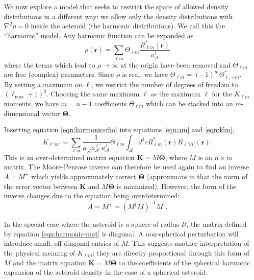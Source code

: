 \documentclass[fleqn,usenatbib]{mnras}
\begin{document}
We now explore a model that seeks to restrict the space of allowed density distributions in a different way: we allow only the density distributions with $\nabla^2 \rho = 0$ inside the asteroid (the harmonic distributions). We  call this  the ``harmonic'' model. Any harmonic function can be expanded as 
\begin{equation}
  \rho(\bm r) = \sum_{\ell m} \Theta_{\ell m}\frac{R_{\ell m}^*(\bm r)}{a_\mathcal{A}^\ell} 
  \label{eqn:harmonic-rho}
\end{equation}
where the terms which lead to $\rho \rightarrow \infty$ at the origin have been removed and $\Theta_{\ell m}$ are free (complex) parameters. Since $\rho$ is real, we have $\Theta_{\ell m}=(-1)^m \Theta_{\ell,-m}^*$. By setting a maximum on $\ell$, we restrict the number of degrees of freedom to $(\ell_\mathrm{max}+ 1)^2$. Choosing the same maximum $\ell$ as the maximum $\ell$ for the $K_{\ell m}$ moments, we have $m=n-1$ coefficients $\Theta_{\ell m}$ which can be stacked into an $m$-dimensional vector $\bm \Theta$.

Inserting equation \ref{eqn:harmonic-rho} into equations \ref{eqn:am} and \ref{eqn:klm},
\begin{equation}
  K_{\ell' m'} = \sum_{\ell m} \frac{1}{\mu_\mathcal{A} a_\mathcal{A}^{\ell'} a_\mathcal{A}^\ell} \Theta_{\ell m} \int_\mathcal{A} d^3 r R_{\ell m}^*(\bm r) R_{\ell' m'}(\bm r).
  \label{eqn:harmonic-mat}
\end{equation}
This is an over-determined matrix equation $\bm K = M \bm \Theta$, where $M$ is an $n \times m$ matrix. The Moore-Penrose inverse can therefore be used again to find an inverse $A=M^+$ which yields approximately correct $\bm \Theta$ (approximate in that the norm of the error vector between $\bm K$ and $M \bm \Theta$ is minimized). However, the form of the inverse changes due to the equation being overdetermined:
\begin{equation}
  A=M^+ = (M^\dagger M)^{-1} M^\dagger .
  \label{eqn:mpi-overdetermined}
\end{equation}

In the special case where the asteroid is a sphere of radius $R$, the matrix defined by equation \ref{eqn:harmonic-mat} is diagonal. %
A non-spherical perturbation will introduce small, off-diagonal entries of $M$. This suggests another interpretation of the physical meaning of $K_{\ell m}$; they are directly proportional through this form of $M$ and the matrix equation $\bm K = M \bm \Theta$ to the coefficients of the spherical harmonic expansion of the asteroid density in the case of a spherical asteroid.
\end{document}
